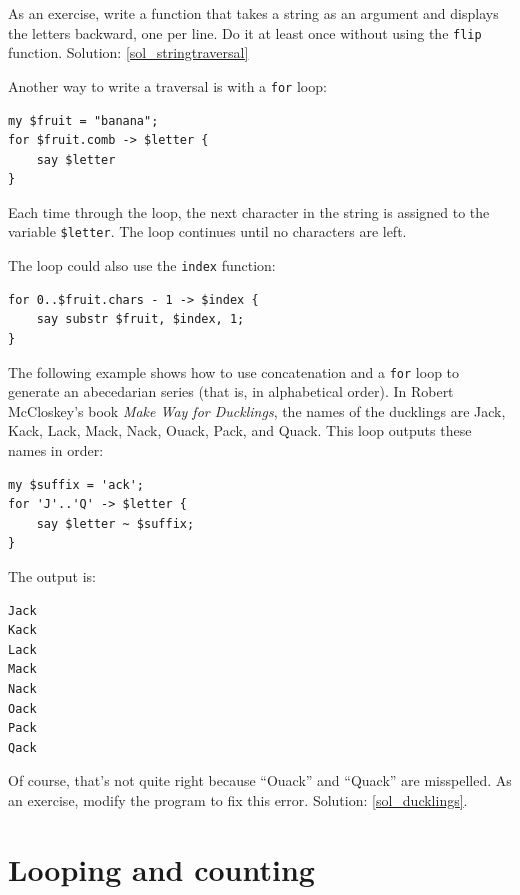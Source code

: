 As an exercise, write a function that takes a string as 
an argument and displays the letters backward, one 
per line. Do it at least once without using the 
{\tt flip} function. Solution: \ref{sol_stringtraversal}

Another way to write a traversal is with a {\tt for} loop:

\begin{verbatim}
my $fruit = "banana";
for $fruit.comb -> $letter {
    say $letter
}
\end{verbatim}
%

Each time through the loop, the next character in the string 
is assigned to the variable {\tt \$letter}.  The loop 
continues until no characters are left.

The loop could also use the {\tt index} function:

\begin{verbatim}
for 0..$fruit.chars - 1 -> $index {
    say substr $fruit, $index, 1;
}
\end{verbatim}
%


The following example shows how to use concatenation and a 
{\tt for} loop to generate an abecedarian series (that is, in
alphabetical order).  In Robert McCloskey's book {\em Make
Way for Ducklings}, the names of the ducklings are Jack, Kack, Lack,
Mack, Nack, Ouack, Pack, and Quack.  This loop outputs these names in
order:

\begin{verbatim}
my $suffix = 'ack';
for 'J'..'Q' -> $letter {
    say $letter ~ $suffix;
}
\end{verbatim}
%
The output is:

\begin{verbatim}
Jack
Kack
Lack
Mack
Nack
Oack
Pack
Qack
\end{verbatim}
%
Of course, that's not quite right because ``Ouack'' and 
``Quack'' are misspelled.  As an exercise, modify the program 
to fix this error. Solution: \ref{sol_ducklings}.


\section{Looping and counting}
\label{counter}

